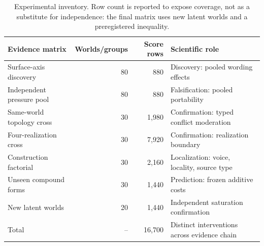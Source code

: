 \begin{table}[H]
\centering
\small
\setlength{\tabcolsep}{4pt}
\renewcommand{\arraystretch}{1.08}
\begin{tabularx}{\textwidth}{@{}Xrr>{\raggedright\arraybackslash}X@{}}
\toprule
Evidence matrix & Worlds/groups & Score rows & Scientific role \\
\midrule
Surface-axis discovery & 80 & 880 & Discovery: pooled wording effects \\
Independent pressure pool & 80 & 880 & Falsification: pooled portability \\
Same-world topology cross & 30 & 1,980 & Confirmation: typed conflict moderation \\
Four-realization cross & 30 & 7,920 & Confirmation: realization boundary \\
Construction factorial & 30 & 2,160 & Localization: voice, locality, source type \\
Unseen compound forms & 30 & 1,440 & Prediction: frozen additive costs \\
New latent worlds & 20 & 1,440 & Independent saturation confirmation \\
\midrule
Total & -- & 16,700 & Distinct interventions across evidence chain \\
\bottomrule
\end{tabularx}
\caption{Experimental inventory. Row count is reported to expose coverage, not as a substitute for independence: the final matrix uses new latent worlds and a preregistered inequality.}
\label{tab:experiment-inventory}
\end{table}
